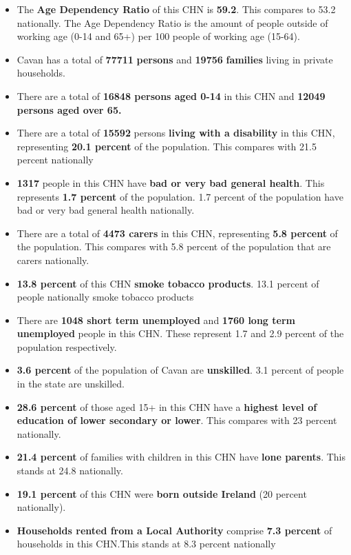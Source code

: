 \documentclass{article}
\begin{document}
\begin{itemize}

\item The \textbf{Age Dependency Ratio} of this CHN is  \textbf{59.2}. This compares to 53.2 nationally. The Age Dependency Ratio is the amount of people outside of working age (0-14 and 65+) per 100 people of working age (15-64). 

\item Cavan has a total of \textbf{\num{77711}} \textbf{persons} and  \textbf{\num{19756}} \textbf{families} living in private households.

\item There are a total of \textbf{\num{16848} persons aged 0-14} in this CHN and \textbf{\num{12049} persons aged over 65.} 

\item There are a total of \textbf{\num{15592}} persons \textbf{living with a disability} in this CHN, representing \textbf{20.1 percent} of the population. This compares with  21.5 percent nationally

\item \textbf{\num{1317}} people in this CHN have \textbf{bad or very bad general health}. This represents \textbf{1.7 percent} of the population. 1.7 percent of the population have bad or very bad general health nationally. 

\item There are a total of \textbf{\num{4473} carers} in this CHN, representing \textbf{5.8 percent} of the population. This compares with 5.8 percent of the population that are carers nationally. 

\item \textbf{13.8 percent} of this CHN \textbf{smoke tobacco products}. 13.1 percent of people nationally smoke tobacco products

\item There are \textbf{\num{1048} short term unemployed} and \textbf{\num{1760} long term unemployed} people in this CHN. These represent 1.7 and 2.9 percent of the population respectively.

\item  \textbf{3.6 percent} of the population of Cavan are \textbf{unskilled}. 3.1 percent of people in the state are unskilled.

\item \textbf{28.6 percent} of those aged 15+ in this CHN have a \textbf{highest level of education of lower secondary or lower}. This compares with 23 percent nationally. 

\item \textbf{21.4 percent} of families with children in this CHN have \textbf{lone parents}. This stands at 24.8 nationally.

\item \textbf{19.1 percent} of this CHN were \textbf{born outside Ireland} (20 percent nationally).

\item \textbf{Households rented from a Local Authority} comprise \textbf{7.3 percent} of households in this CHN.This stands at 8.3 percent nationally

\end{itemize}
\end{document}
